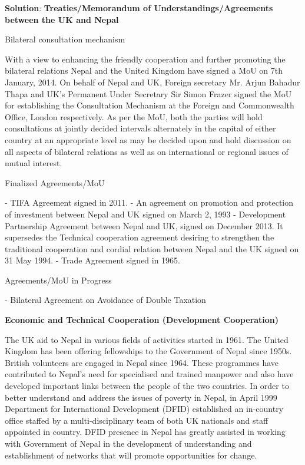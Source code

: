 \documentclass[
]{book}
\newenvironment{solution}{ {\bfseries Solution}:}{}
\begin{document}
\begin{solution}
\textbf{Treaties/Memorandum of Understandings/Agreements between the UK and Nepal}

Bilateral consultation mechanism

With a view to enhancing the friendly cooperation and further promoting the bilateral relations Nepal and the United Kingdom have signed a MoU on 7th January, 2014. On behalf of Nepal and UK, Foreign secretary Mr. Arjun Bahadur Thapa and UK's Permanent Under Secretary Sir Simon Frazer signed the MoU for establishing the Consultation Mechanism at the Foreign and Commonwealth Office, London respectively. As per the MoU, both the parties will hold consultations at jointly decided intervals alternately in the capital of either country at an appropriate level as may be decided upon and hold discussion on all aspects of bilateral relations as well as on international or regional issues of mutual interest.

Finalized Agreements/MoU

- TIFA Agreement signed in 2011.
- An agreement on promotion and protection of investment between Nepal and UK signed on March 2, 1993
- Development Partnership Agreement between Nepal and UK, signed on December 2013. It supersedes the Technical cooperation agreement desiring to strengthen the traditional cooperation and cordial relation between Nepal and the UK signed on 31 May 1994.
- Trade Agreement signed in 1965.

Agreements/MoU in Progress

- Bilateral Agreement on Avoidance of Double Taxation

\textbf{Economic and Technical Cooperation (Development Cooperation)}

The UK aid to Nepal in various fields of activities started in 1961. The United Kingdom has been offering fellowships to the Government of Nepal since 1950s. British volunteers are engaged in Nepal since 1964. These programmes have contributed to Nepal's need for specialised and trained manpower and also have developed important links between the people of the two countries. In order to better understand and address the issues of poverty in Nepal, in April 1999 Department for International Development (DFID) established an in-country office staffed by a multi-disciplinary team of both UK nationals and staff appointed in country. DFID presence in Nepal has greatly assisted in working with Government of Nepal in the development of understanding and establishment of networks that will promote opportunities for change.


\end{solution}
\end{document}
